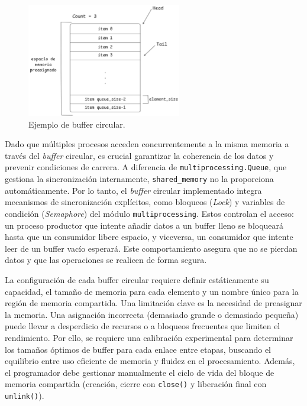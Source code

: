 \documentclass[11pt,spanish,listoffigures,listoftables]{tfgetsinf}
\begin{document}
\begin{figure}[H]
   \centering
   \includegraphics[width=0.6\textwidth]{images/diseno_e_implementacion/buffer_circular.png}
   \caption[Ejemplo de buffer circular]{Ejemplo de buffer circular.}
   \label{fig:buffer_circular}
\end{figure}

Dado que múltiples procesos acceden concurrentemente a la misma memoria a través del \textit{buffer} circular, es crucial garantizar la coherencia de los datos y prevenir condiciones de carrera. A diferencia de \texttt{multiprocessing.Queue}, que gestiona la sincronización internamente, \texttt{shared\_memory} no la proporciona automáticamente. Por lo tanto, el \textit{buffer} circular implementado integra mecanismos de sincronización explícitos, como bloqueos (\textit{Lock}) y variables de condición (\textit{Semaphore}) del módulo \texttt{multiprocessing}. Estos controlan el acceso: un proceso productor que intente añadir datos a un buffer lleno se bloqueará hasta que un consumidor libere espacio, y viceversa, un consumidor que intente leer de un buffer vacío esperará. Este comportamiento asegura que no se pierdan datos y que las operaciones se realicen de forma segura.

La configuración de cada buffer circular requiere definir estáticamente su capacidad, el tamaño de memoria para cada elemento y un nombre único para la región de memoria compartida. Una limitación clave es la necesidad de preasignar la memoria. Una asignación incorrecta (demasiado grande o demasiado pequeña) puede llevar a desperdicio de recursos o a bloqueos frecuentes que limiten el rendimiento. Por ello, se requiere una calibración experimental para determinar los tamaños óptimos de buffer para cada enlace entre etapas, buscando el equilibrio entre uso eficiente de memoria y fluidez en el procesamiento. Además, el programador debe gestionar manualmente el ciclo de vida del bloque de memoria compartida (creación, cierre con \texttt{close()} y liberación final con \texttt{unlink()}).
\end{document}
